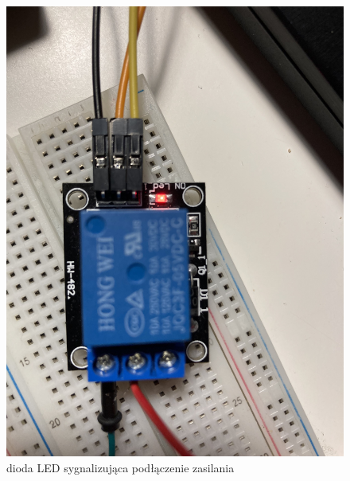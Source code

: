 \documentclass[11pt, a4paper]{article}
\begin{document}
\vspace{0.5cm}
\begin{figure}[h!]
    \centering
    \includegraphics[scale=0.08]{fig/obrazki/działanie_ukladu/bliskoon.jpg}
    \caption{dioda LED sygnalizująca podłączenie zasilania}
    \label{fig:my_label}
\end{figure}
\vspace{0.5cm}
\end{document}
